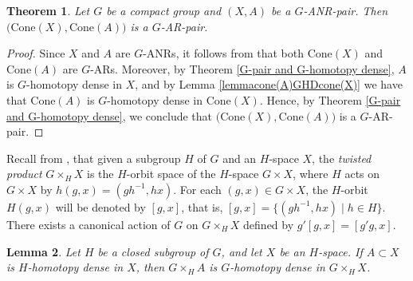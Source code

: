 \documentclass[12pt]{amsart}
\newtheorem{theorem}{Theorem}[section]
\newtheorem{lemma}[theorem]{Lemma}
\theoremstyle{definition}
\begin{document}
	\begin{theorem}\label{cone(A)GHDcone(X)}
		\rm{Let $G$ be a compact group and $(X,A)$ be a $G$-ANR-pair. Then $\big(\mathrm{Cone}(X),\mathrm{Cone}(A)\big)$ is a $G$-AR-pair.}
	\end{theorem}
	
	\begin{proof}
		Since $X$ and $A$ are $G$-ANRs, it follows from \cite[Proposition 2.2]{A9} that both $\mathrm{Cone}(X)$ and $\mathrm{Cone}(A)$ are $G$-ARs. Moreover, by Theorem \ref{G-pair and G-homotopy dense}, $A$ is $G$-homotopy dense in $X$, and by Lemma \ref{lemmacone(A)GHDcone(X)} we have that $\mathrm{Cone}(A)$ is $G$-homotopy dense in $\mathrm{Cone}(X)$. Hence, by Theorem \ref{G-pair and G-homotopy dense}, we conclude that $\big(\mathrm{Cone}(X), \mathrm{Cone}(A)\big)$ is a $G$-AR-pair.
	\end{proof}
	
	Recall from \cite[Ch. II, \S 2]{GB}, that given a subgroup $H$ of $G$ and an $H$-space $X$, the \textit{twisted product} $G\times_H X$ is the $H$-orbit space of the $H$-space $G\times X$, where $H$ acts on $G\times X$ by $h(g,x)=(gh^{-1},hx)$. For each $(g,x)\in G\times X$, the $H$-orbit $H(g,x)$ will be denoted by $[g,x]$, that is, $[g,x]=\{(gh^{-1},hx) \mid h\in H\}$. There exists a canonical action of $G$ on $G\times_HX$ defined by $g'[g,x]=[g'g,x]$. 
		
	\begin{lemma}\label{lemmaGxA G-HD GxD}
		\rm{Let $H$ be a closed subgroup of $G$, and let $X$ be an $H$-space. If $A\subset X$ is $H$-homotopy dense in $X$, then $G\times_H A$ is $G$-homotopy dense in $G\times_H X$.}
	\end{lemma}
	
\end{document}
